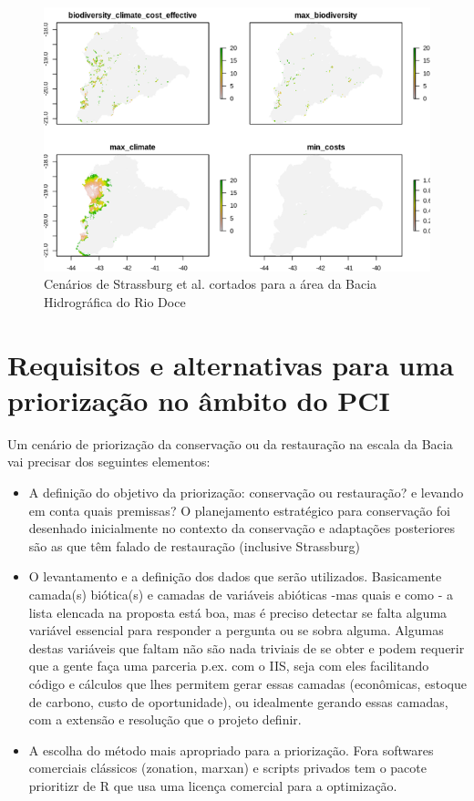 \documentclass{article}
\begin{document}
\begin{figure}
    \centering
    \includegraphics[scale=0.7]{figs/scenarios_BHRD.png}
    \caption{Cenários de Strassburg et al. \cite{Strassburg2019} cortados para a área da Bacia Hidrográfica do Rio Doce}
    \label{fig:scenarios_BHRD}
\end{figure}

\section{Requisitos e alternativas para uma priorização no âmbito do PCI}%
Um cenário de priorização da conservação ou da restauração na escala da Bacia vai precisar dos seguintes elementos: 

\begin{itemize}
    \item A definição do objetivo da priorização: conservação ou restauração? e levando em conta quais premissas? O planejamento estratégico para conservação foi desenhado inicialmente no contexto da conservação e adaptações posteriores são as que têm falado de restauração (inclusive Strassburg) %
    \item O levantamento e a definição dos dados que serão utilizados. Basicamente camada(s) biótica(s) e camadas de variáveis abióticas -mas quais e como - a lista elencada na proposta está boa, mas é preciso detectar se falta alguma variável essencial para responder a pergunta ou se sobra alguma. Algumas destas variáveis que faltam não são nada triviais de se obter e podem requerir que a gente faça uma parceria p.ex. com o IIS, seja com eles facilitando código e cálculos que lhes permitem gerar essas camadas (econômicas, estoque de carbono, custo de oportunidade), ou idealmente gerando essas camadas, com a extensão e resolução que o projeto definir. %
    \item A escolha do método mais apropriado para a priorização. Fora softwares comerciais clássicos (zonation, marxan) e scripts privados %
    tem o pacote prioritizr de R que usa uma licença comercial para a optimização. 
    
\end{itemize}

\printbibliography
\end{document}
